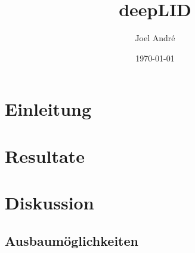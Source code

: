 \documentclass[12pt,twoside]{article}
\title{deepLID}
\author{Joel André}
\date{\today{}}
\begin{document}
	
	
	
	\tableofcontents
	\newpage
	
	\section{Einleitung}
	
	
	
	\section{Resultate}
	\section{Diskussion}
	\subsection{Ausbaumöglichkeiten}
	
	
	\printbibliography
	\listoffigures
\end{document}
